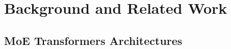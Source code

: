 \documentclass{article} %
\begin{document}

\section{Background and Related Work}


\subsection{MoE Transformers Architectures}
% 
\end{document}
